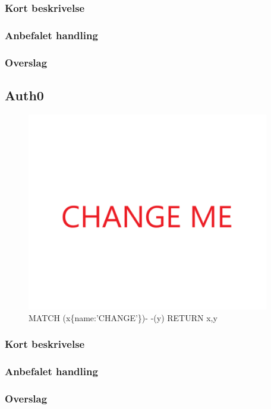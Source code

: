 \documentclass{article}
\begin{document}
\subsubsection{Kort beskrivelse}
\subsubsection{Anbefalet handling}
\subsubsection{Overslag}


\subsection{Auth0}
\begin{figure}[h]
\includegraphics[width=300pt]{CHANGE.PNG}
\caption{MATCH (x\{name:'CHANGE'\})- -(y) RETURN x,y}
\end{figure}
\subsubsection{Kort beskrivelse}
\subsubsection{Anbefalet handling}
\subsubsection{Overslag}
\end{document}

